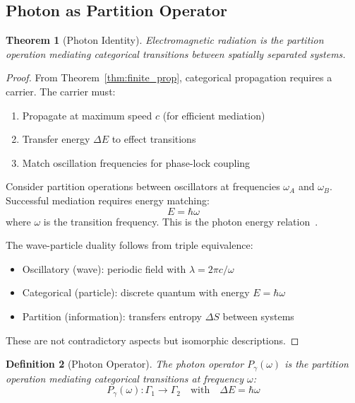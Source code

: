 \documentclass[aps,prd,twocolumn,superscriptaddress,floatfix,nofootinbib]{revtex4-2}
\newtheorem{theorem}{Theorem}[section]
\newtheorem{definition}[theorem]{Definition}
\theoremstyle{remark}
\newcommand{\Pop}{P}
\newcommand{\Gstate}{\Gamma}
\begin{document}
\subsection{Photon as Partition Operator}

\begin{theorem}[Photon Identity]
\label{thm:photon}
Electromagnetic radiation is the partition operation mediating categorical transitions between spatially separated systems.
\end{theorem}

\begin{proof}
From Theorem~\ref{thm:finite_prop}, categorical propagation requires a carrier. The carrier must:
\begin{enumerate}
\item Propagate at maximum speed $c$ (for efficient mediation)
\item Transfer energy $\Delta E$ to effect transitions
\item Match oscillation frequencies for phase-lock coupling
\end{enumerate}

Consider partition operations between oscillators at frequencies $\omega_A$ and $\omega_B$. Successful mediation requires energy matching:
\begin{equation}
E = \hbar\omega
\end{equation}
where $\omega$ is the transition frequency. This is the photon energy relation~\cite{planck1901,einstein1905}.

The wave-particle duality follows from triple equivalence:
\begin{itemize}
\item Oscillatory (wave): periodic field with $\lambda = 2\pi c/\omega$
\item Categorical (particle): discrete quantum with energy $E = \hbar\omega$
\item Partition (information): transfers entropy $\Delta S$ between systems
\end{itemize}

These are not contradictory aspects but isomorphic descriptions.
\end{proof}

\begin{definition}[Photon Operator]
\label{def:photon_op}
The photon operator $\Pop_\gamma(\omega)$ is the partition operation mediating categorical transitions at frequency $\omega$:
\begin{equation}
\Pop_\gamma(\omega): \Gstate_1 \to \Gstate_2 \quad \text{with} \quad \Delta E = \hbar\omega
\end{equation}
\end{definition}
\end{document}
